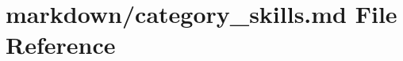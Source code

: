 \hypertarget{category__skills_8md}{}\section{markdown/category\+\_\+skills.md File Reference}
\label{category__skills_8md}
